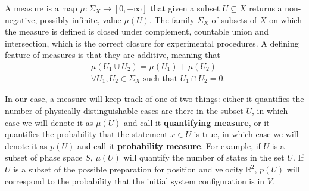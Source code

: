 \documentclass[10pt,twocolumn, nofootinbib]{revtex4-2}
\begin{document}
A measure is a map $\mu : \Sigma_X \to [0,+\infty]$ that given a subset $U \subseteq X$ returns a non-negative, possibly infinite, value $\mu(U)$. The family $\Sigma_X$ of subsets of $X$ on which the measure is defined is closed under complement, countable union and intersection, which is the correct closure for experimental procedures. A defining feature of measures is that they are additive, meaning that
\begin{equation}\label{additive_measure}
	\begin{aligned}
		&\mu(U_1 \cup U_2) = \mu(U_1) + \mu(U_2) \\
		&\forall U_1, U_2 \in \Sigma_X \text{ such that } U_1 \cap U_2 = 0.
	\end{aligned}
\end{equation}

In our case, a measure will keep track of one of two things: either it quantifies the number of physically distinguishable cases are there in the subset $U$, in which case we will denote it as $\mu(U)$ and call it \textbf{quantifying measure}, or it quantifies the probability that the statement $x \in U$ is true, in which case we will denote it as $p(U)$ and call it \textbf{probability measure}. For example, if $U$ is a subset of phase space $S$, $\mu(U)$ will quantify the number of states in the set $U$. If $U$ is a subset of the possible preparation for position and velocity $\mathbb{R}^2$, $p(U)$ will correspond to the probability that the initial system configuration is in $V$.

\end{document}

